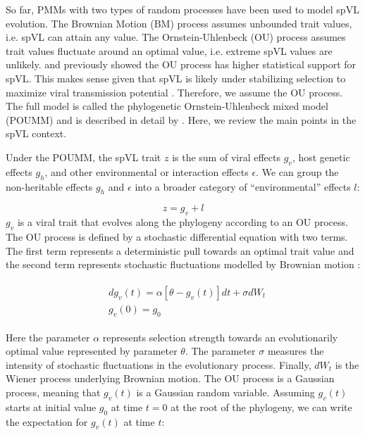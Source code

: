 \documentclass[11pt]{article}
\begin{document}
\begin{linenumbers}
So far, PMMs with two types of random processes have been used to model spVL evolution. The Brownian Motion (BM) process assumes unbounded trait values, i.e. spVL can attain any value. The Ornstein-Uhlenbeck (OU) process assumes trait values fluctuate around an optimal value, i.e. extreme spVL values are unlikely. \citet{Mitov2018} and \citet{Bertels2018} previously showed the OU process has higher statistical support for spVL. This makes sense given that spVL is likely under stabilizing selection to maximize viral transmission potential \citep{Fraser2014}. Therefore, we assume the OU process. The full model is called the phylogenetic Ornstein-Uhlenbeck mixed model (POUMM) and is described in detail by \citet{Mitov2018}. Here, we review the main points in the spVL context.

Under the POUMM, the spVL trait $z$ is the sum of viral effects $g_v$, host genetic effects $g_h$, and other environmental or interaction effects $\epsilon$. We can group the non-heritable effects $g_h$ and $\epsilon$ into a broader category of ``environmental'' effects $l$: 

\begin{equation}
    z = g_{v} + l
\end{equation}
$g_v$ is a viral trait that evolves along the phylogeny according to an OU process. The OU process is defined by a stochastic differential equation with two terms. The first term represents a deterministic pull towards an optimal trait value and the second term represents stochastic fluctuations modelled by Brownian motion \citep{Butler2004}:

\begin{align}
\begin{split}
	&dg_v(t) = \alpha[\theta - g_v(t)]dt + \sigma dW_t \\
	&g_v(0) = g_0 
	\label{eq:OUprocess}
\end{split}
\end{align}

Here the parameter $\alpha$ represents selection strength towards an evolutionarily optimal value represented by parameter $\theta$. The parameter $\sigma$ measures the intensity of stochastic fluctuations in the evolutionary process. Finally, $dW_t$ is the Wiener process underlying Brownian motion. The OU process is a Gaussian process, meaning that $g_v(t)$ is a Gaussian random variable. Assuming $g_v(t)$ starts at initial value $g_0$ at time $t = 0$ at the root of the phylogeny, we can write the expectation for $g_v(t)$ at time $t$: 


\end{linenumbers}
\end{document}
